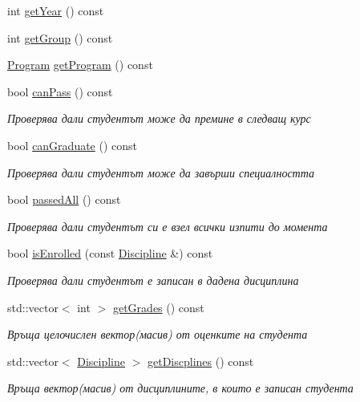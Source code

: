 \begin{DoxyCompactItemize}
\item 
int \hyperlink{class_student_a66cafd1014d34eea4eb9c0e644a0b825}{get\+Year} () const
\item 
int \hyperlink{class_student_aa577682ad72c80d77524adada6d99ad2}{get\+Group} () const
\item 
\hyperlink{class_program}{Program} \hyperlink{class_student_a8cbf8bfe97a658ed07f67c6698aee6bb}{get\+Program} () const
\item 
bool \hyperlink{class_student_a84aa35d558891ea41302326b5879a3ae}{can\+Pass} () const
\begin{DoxyCompactList}\small\item\em Проверява дали студентът може да премине в следващ курс \end{DoxyCompactList}\item 
bool \hyperlink{class_student_a082a64426f8133e4e176adb50ac0b477}{can\+Graduate} () const
\begin{DoxyCompactList}\small\item\em Проверява дали студентът може да завърши специалността \end{DoxyCompactList}\item 
bool \hyperlink{class_student_a29d78e43e7fa033e1497fa26c02edf0f}{passed\+All} () const
\begin{DoxyCompactList}\small\item\em Проверява дали студентът си е взел всички изпити до момента \end{DoxyCompactList}\item 
bool \hyperlink{class_student_a21cc1d849823294752049a9eef021135}{is\+Enrolled} (const \hyperlink{class_discipline}{Discipline} \&) const
\begin{DoxyCompactList}\small\item\em Проверява дали студентът е записан в дадена дисциплина \end{DoxyCompactList}\item 
std\+::vector$<$ int $>$ \hyperlink{class_student_aeb25e6da52ead51103f0b3ee5e10953f}{get\+Grades} () const
\begin{DoxyCompactList}\small\item\em Връща целочислен вектор(масив) от оценките на студента \end{DoxyCompactList}\item 
std\+::vector$<$ \hyperlink{class_discipline}{Discipline} $>$ \hyperlink{class_student_a8a82196012942702fa9af422654cc614}{get\+Discplines} () const
\begin{DoxyCompactList}\small\item\em Връща вектор(масив) от дисциплините, в които е записан студента \end{DoxyCompactList}\item 

\end{DoxyCompactItemize}
